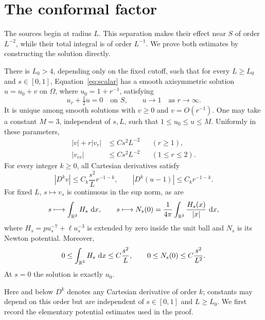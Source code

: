\section{The conformal factor}\label{sec:elliptic}

The sources begin at radius $L$.  This separation makes their effect near
$S$ of order $L^{-2}$, while their total integral is of order $L^{-1}$.
We prove both estimates by constructing the solution directly.

\begin{proposition}\label{prop:conformal-factor}
There is $L_0>4$, depending only on the fixed cutoff, such that for every
$L\ge L_0$ and $s\in[0,1]$, Equation~\eqref{eq:scalar} has a smooth
axisymmetric solution $u=u_0+v$ on $\Omega$, where $u_0=1+r^{-1}$,
satisfying
\begin{equation}\label{eq:robin}
 u_r+\tfrac12u=0\quad\text{on }S,
 \qquad u\longrightarrow1\quad\text{as }r\longrightarrow\infty.
\end{equation}
It is unique among smooth solutions with $v\ge0$ and $v=O(r^{-1})$.
One may take a constant $M=3$, independent of $s,L$, such that
$1\le u_0\le u\le M$.  Uniformly in these parameters,
\begin{equation}\label{eq:radial-bounds}
 \begin{aligned}
  |v|+r|v_r|&\le Cs^2L^{-2} &&(r\ge1),\\
  |v_{rr}|&\le Cs^2L^{-2} &&(1\le r\le2).
 \end{aligned}
\end{equation}
For every integer $k\ge0$, all Cartesian derivatives satisfy
\begin{equation}\label{eq:all-derivative-bounds}
 |D^kv|\le C_k\frac{s^2}{L}r^{-1-k},
 \qquad |D^k(u-1)|\le C_k r^{-1-k}.
\end{equation}
For fixed $L$, $s\mapsto v_s$ is continuous in the sup norm, as are
\[
 s\longmapsto\int_{\mathbb R^3}H_s\,\mathop{}\!\mathrm d x,
 \qquad
 s\longmapsto N_s(0)=\frac1{4\pi}\int_{\mathbb R^3}\frac{H_s(x)}{|x|}\,\mathop{}\!\mathrm d x,
\]
where $H_s=pu_s^{-7}+\ell u_s^{-3}$ is extended by zero inside the unit
ball and $N_s$ is its Newton potential.  Moreover,
\begin{equation}\label{eq:source-integrals}
 0\le\int_{\mathbb R^3}H_s\,\mathop{}\!\mathrm d x\le C\frac{s^2}{L},
 \qquad 0\le N_s(0)\le C\frac{s^2}{L^2}.
\end{equation}
At $s=0$ the solution is exactly $u_0$.
\end{proposition}

Here and below $D^k$ denotes any Cartesian derivative of order $k$;
constants may depend on this order but are independent of
$s\in[0,1]$ and $L\ge L_0$.
We first record the elementary potential estimates used in the proof.

